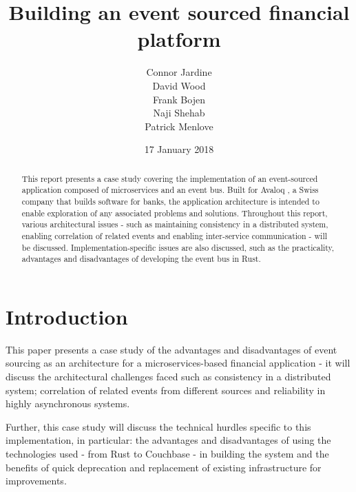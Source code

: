 \documentclass{l3proj}
\begin{document}
\title{Building an event sourced financial platform}
\author{Connor Jardine \\
        David Wood \\
        Frank Bojen \\
        Naji Shehab \\
        Patrick Menlove}
\date{17 January 2018}
\maketitle

\begin{abstract}
This report presents a case study covering the implementation of an event-sourced application composed of microservices and an event bus. Built for Avaloq \cite{avaloq}, a Swiss company that builds software for banks, the application architecture is intended to enable exploration of any associated problems and solutions. Throughout this report, various architectural issues - such as maintaining consistency in a distributed system, enabling correlation of related events and enabling inter-service communication - will be discussed. Implementation-specific issues are also discussed, such as the practicality, advantages and disadvantages of developing the event bus in Rust.
\end{abstract}
\educationalconsent

\newpage
\tableofcontents

\newpage
\section{Introduction}
\label{sec:introduction}
This paper presents a case study of the advantages and disadvantages of event sourcing as an architecture for a microservices-based financial application - it will discuss the architectural challenges faced such as consistency in a distributed system; correlation of related events from different sources and reliability in highly asynchronous systems.

Further, this case study will discuss the technical hurdles specific to this implementation, in particular: the advantages and disadvantages of using the technologies used - from Rust to Couchbase - in building the system and the benefits of quick deprecation and replacement of existing infrastructure for improvements.
\end{document}
